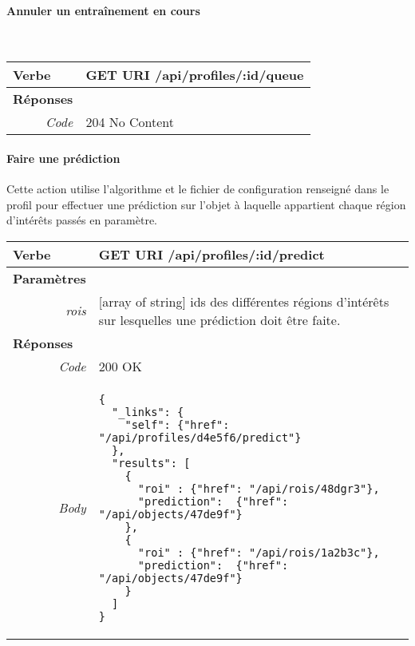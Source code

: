 \begin{appendices}
\begin{absolutelynopagebreak}
\paragraph{Annuler un entraînement en cours}
~

\begin{tabular}{@{}p{2cm}p{11.5cm}@{}}
    \toprule
    \textbf{Verbe}                        & GET \hspace{2.5cm} \textbf{URI} \hspace{0.25cm} /api/profiles/:id/queue   \\ \midrule
    \textbf{Réponses}                     &        \\
    \multicolumn{1}{r}{\textit{Code}}   & 204 No Content \\
    \bottomrule
\end{tabular}
\end{absolutelynopagebreak}


\begin{absolutelynopagebreak}
\paragraph{Faire une prédiction}
Cette action utilise l'algorithme et le fichier de configuration renseigné dans le profil pour effectuer une prédiction sur l'objet à laquelle appartient chaque région d'intérêts passés en paramètre.

\begin{tabular}{@{}p{2cm}p{11.5cm}@{}}
    \toprule
    \textbf{Verbe}                        & GET \hspace{2.5cm} \textbf{URI} \hspace{0.25cm} /api/profiles/:id/predict   \\ \midrule
    \textbf{Paramètres}                   &        \\
    \multicolumn{1}{r}{\textit{rois}} & [array of string] ids des différentes régions d'intérêts sur lesquelles une prédiction doit être faite.  \\
    \midrule
    \textbf{Réponses}                     &        \\
    \multicolumn{1}{r}{\textit{Code}}   & 200 OK \\
    \multicolumn{1}{r}{\textit{Body}}   & \begin{verbatim}
{
  "_links": {
    "self": {"href": "/api/profiles/d4e5f6/predict"}
  },
  "results": [
    {
      "roi" : {"href": "/api/rois/48dgr3"},
      "prediction":  {"href": "/api/objects/47de9f"}
    },
    {
      "roi" : {"href": "/api/rois/1a2b3c"},
      "prediction":  {"href": "/api/objects/47de9f"}
    }
  ]
}
    \end{verbatim}
    \\
    \bottomrule
\end{tabular}
\end{absolutelynopagebreak}


\end{appendices}
